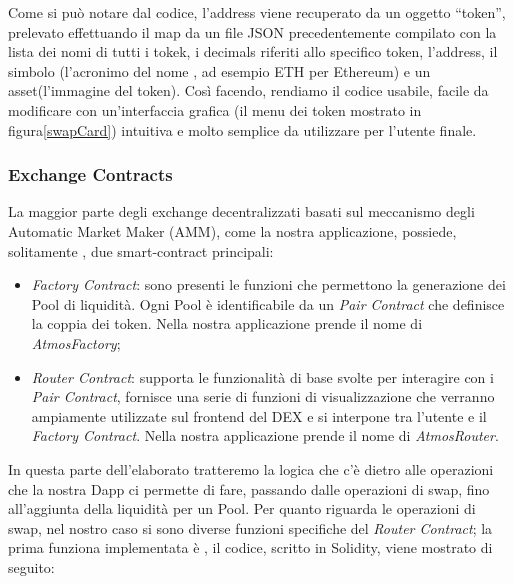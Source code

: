Come si può notare dal codice, l'address viene recuperato da un oggetto “token”, prelevato effettuando il map da un file JSON precedentemente compilato con la lista dei nomi di tutti i tokek, i decimals riferiti allo specifico token, l'address, il simbolo (l'acronimo del nome , ad esempio ETH per Ethereum) e un asset(l'immagine del token). Così facendo, rendiamo il codice usabile, facile da modificare con un'interfaccia grafica (il menu dei token mostrato in figura\ref{swapCard}) intuitiva e molto semplice da utilizzare per l'utente finale.

\subsubsection{Exchange Contracts}\makeatletter{}\makeatother
\label{Exchange Contracts}

La maggior parte degli exchange decentralizzati basati sul meccanismo degli Automatic Market Maker (AMM), come la nostra applicazione, possiede, solitamente , due smart-contract principali:

\begin{itemize}
\item \textit{Factory Contract}: sono presenti le funzioni che permettono la generazione dei Pool di liquidità. Ogni Pool è identificabile da un \textit{Pair Contract} che definisce la coppia dei token. Nella nostra applicazione prende il nome di \textit{AtmosFactory};
\item \textit{Router Contract}: supporta le funzionalità di base svolte per interagire con i \textit{Pair Contract}, fornisce una serie di funzioni di visualizzazione che verranno ampiamente utilizzate sul frontend del DEX e si interpone tra l'utente e il \textit{Factory Contract}. Nella nostra applicazione prende il nome di \textit{AtmosRouter}.
\end{itemize}

In questa parte dell'elaborato tratteremo la logica che c'è dietro alle operazioni che la nostra Dapp ci permette di fare, passando dalle operazioni di swap, fino all'aggiunta della liquidità per un Pool.
Per quanto riguarda le operazioni di swap, nel nostro caso si sono diverse funzioni specifiche del \textit{Router Contract}; la prima funziona implementata è \textcourier{ \ref{swapExactTokensForTokens}}, il codice, scritto in Solidity, viene mostrato di seguito:\\


